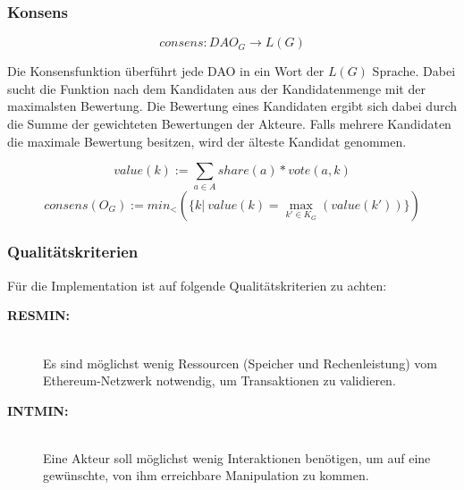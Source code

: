 \documentclass[a4paper,12pt]{report}
\begin{document}
% 




\subsubsection*{Konsens}

  \[consens: DAO_G \rightarrow L(G)\] 


Die Konsensfunktion überführt jede DAO in ein Wort der $L(G)$ Sprache.
Dabei sucht die Funktion nach dem Kandidaten aus der Kandidatenmenge mit der maximalsten Bewertung. Die Bewertung eines Kandidaten ergibt sich dabei durch die Summe der gewichteten Bewertungen der Akteure. Falls mehrere Kandidaten die maximale Bewertung besitzen, wird der älteste Kandidat genommen.

\[ value(k) := \sum_{a\in A} share(a) * vote(a,k) \] 
\[ consens (O_G) := min_<(\{ k |\ value(k) = \max_{k'\in K_G} (value(k')) \}) \]




\subsubsection*{Qualitätskriterien}

Für die Implementation ist auf folgende Qualitätskriterien zu achten:

\begin{description} 
  \item[\textbf{RESMIN:}]\hfill \\
    Es sind möglichst wenig Ressourcen (Speicher und Rechenleistung) vom Ethereum-Netzwerk notwendig, um Transaktionen zu validieren.
  \item[\textbf{INTMIN:}]\hfill \\
    Eine Akteur soll möglichst wenig Interaktionen benötigen, um auf eine gewünschte, von ihm erreichbare Manipulation zu kommen.
\end{description}

% 
\end{document}
